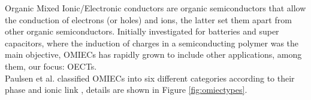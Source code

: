 Organic Mixed Ionic/Electronic conductors are organic semiconductors that allow the conduction of electrons (or holes) and ions, the latter set them apart from other organic semiconductors. %
Initially investigated for batteries and super capacitors, %
where the induction of charges in a semiconducting polymer was the main objective, OMIECs has rapidly grown to include other applications, among them, our focus: OECTs.\\
Paulsen et al. classified OMIECs into six different categories according to their phase and ionic link \cite{paulsenOrganicMixedIonic2020}, details are shown in Figure \ref{fig:omiectypes}. 



